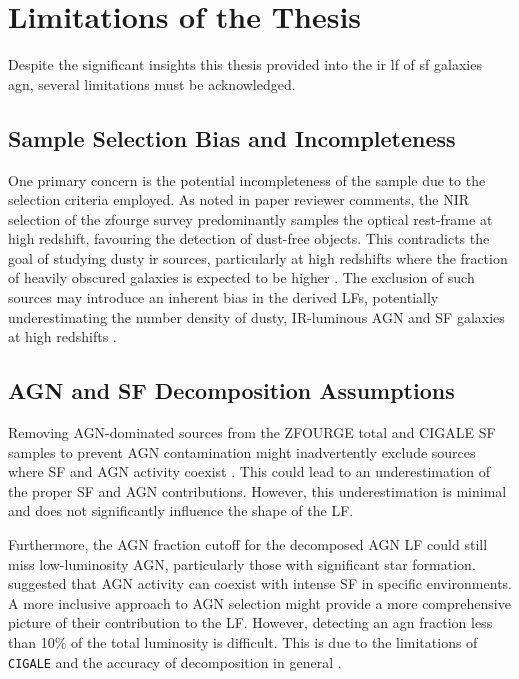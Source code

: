 \section{Limitations of the Thesis} \label{Sec: Limitations}

Despite the significant insights this thesis provided into the \gls{ir} \gls{lf} of \gls{sf} galaxies \gls{agn}, several limitations must be acknowledged.

\subsection{Sample Selection Bias and Incompleteness}
One primary concern is the potential incompleteness of the sample due to the selection criteria employed. As noted in paper reviewer comments, the NIR selection of the \gls{zfourge} survey predominantly samples the optical rest-frame at high redshift, favouring the detection of dust-free objects. This contradicts the goal of studying dusty \gls{ir} sources, particularly at high redshifts where the fraction of heavily obscured galaxies is expected to be higher \citep{symeonidis_agn_2021}. The exclusion of such sources may introduce an inherent bias in the derived LFs, potentially underestimating the number density of dusty, IR-luminous AGN and SF galaxies at high redshifts \citep{gruppioni_herschel_2013}.

\subsection{AGN and SF Decomposition Assumptions}
Removing AGN-dominated sources from the ZFOURGE total and CIGALE SF samples to prevent AGN contamination might inadvertently exclude sources where SF and AGN activity coexist \citep{hatziminaoglou_hermes_2010}. This could lead to an underestimation of the proper SF and AGN contributions. However, this underestimation is minimal and does not significantly influence the shape of the LF.

Furthermore, the AGN fraction cutoff for the decomposed AGN LF could still miss low-luminosity AGN, particularly those with significant star formation. \cite{hopkins_cosmological_2008} suggested that AGN activity can coexist with intense SF in specific environments. A more inclusive approach to AGN selection might provide a more comprehensive picture of their contribution to the LF. However, detecting an \gls{agn} fraction less than 10\% of the total luminosity is difficult. This is due to the limitations of \texttt{CIGALE} and the accuracy of decomposition in general \citep{hayward_should_2015}.

